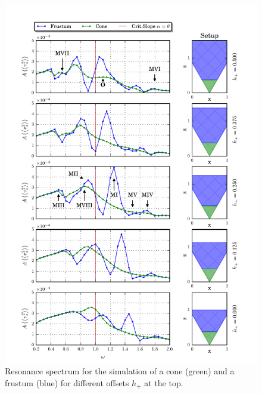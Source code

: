 \begin{figure}[!pt]
  \centering
  \includegraphics{gfx/cone/final/transition.pdf}
  \caption{
      \label{fig:cone:finaltransition}
    Resonance spectrum for the simulation of a cone (green) and a frustum (blue) for different offsets $h_+$ at the
    top.
    }
\end{figure}
\clearpage

